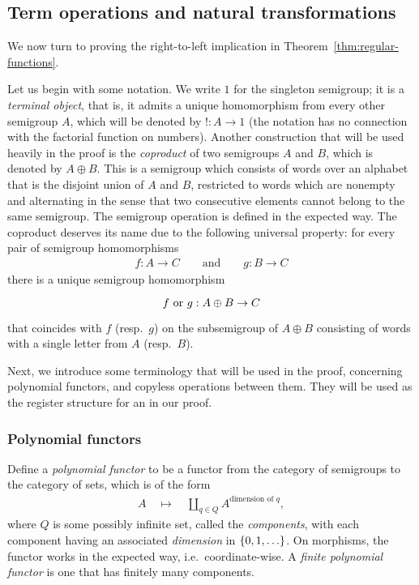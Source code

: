 

\subsection{Term operations and natural transformations}
We now turn to proving the right-to-left implication in Theorem~\ref{thm:regular-functions}.

Let us begin with some notation. We write $1$ for the singleton semigroup; it is a \emph{terminal object}, that is, it admits a unique homomorphism from every other semigroup $A$, which will be denoted by $! : A \to 1$ (the notation has no connection with the factorial function on numbers). Another construction that will be used heavily in the proof is the \emph{coproduct} of two semigroups $A$ and $B$, which is denoted by $A \oplus B$. This is a semigroup which consists of words over an alphabet that is the disjoint union of $A$ and $B$, restricted to words which are nonempty and alternating in the sense that two consecutive elements cannot belong to the same semigroup. The semigroup operation is defined in the expected way. The coproduct deserves its name due to the following universal property: for every pair of semigroup homomorphisms
\begin{align*}
f : A \to C \qquad \text{and} \qquad g : B \to C
\end{align*}
there is a unique semigroup homomorphism
\[
\begin{tikzcd}
f \text{ or } g : A \oplus B \to C
\end{tikzcd}
\]
that coincides with $f$ (resp.\ $g$) on the subsemigroup of $A \oplus B$ consisting of words with a single letter from $A$ (resp.\ $B$).

Next, we introduce some terminology that will be used in the proof, concerning  polynomial functors, and copyless operations between them. They will be used as the register structure for an \sst in our proof. 

\subsubsection{Polynomial functors}
Define a \emph{polynomial functor} to be a functor from the category of semigroups to the category of sets, which is of the form
\begin{align*}
A \quad \mapsto \quad \coprod_{q \in Q} A^{\text{dimension of } q},
\end{align*}
where $Q$ is some possibly infinite set, called the \emph{components}, with each  component having an associated \emph{dimension} in $\{0,1,\ldots\}$. On morphisms, the functor works in the expected way, i.e.~coordinate-wise.  A \emph{finite polynomial functor} is one that has finitely many components. 

